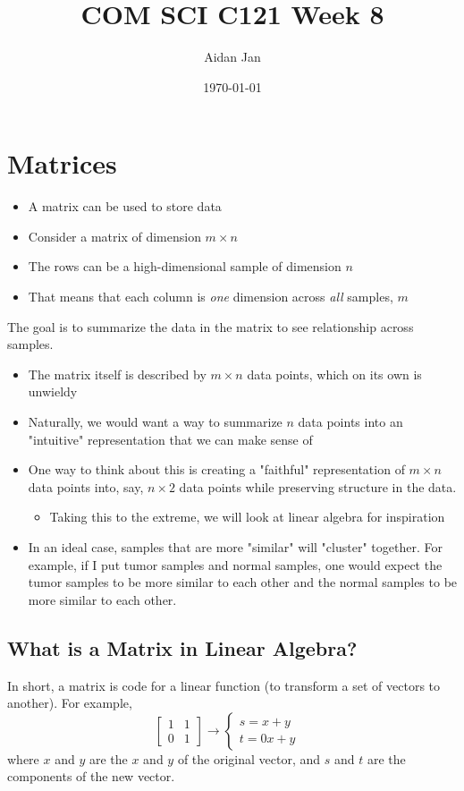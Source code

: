 \documentclass[10pt]{article}
\title{COM SCI C121 Week 8}
\author{Aidan Jan}
\date{\today}
\begin{document}
\maketitle

\section*{Matrices}
\begin{itemize}
    \item A matrix can be used to store data
    \item Consider a matrix of dimension $m \times n$
    \item The rows can be a high-dimensional sample of dimension $n$
    \item That means that each column is \textit{one} dimension across \textit{all} samples, $m$
\end{itemize}
The goal is to summarize the data in the matrix to see relationship across samples.
\begin{itemize}
    \item The matrix itself is described by $m \times n$ data points, which on its own is unwieldy
    \item Naturally, we would want a way to summarize $n$ data points into an "intuitive" representation that we can make sense of
    \item One way to think about this is creating a "faithful" representation of $m \times n$ data points into, say, $n \times 2$ data points while preserving structure in the data.
    \begin{itemize}
        \item Taking this to the extreme, we will look at linear algebra for inspiration
    \end{itemize}
    \item In an ideal case, samples that are more "similar" will "cluster" together.  For example, if I put tumor samples and normal samples, one would expect the tumor samples to be more similar to each other and the normal samples to be more similar to each other.
\end{itemize}

\subsection*{What is a Matrix in Linear Algebra?}
In short, a matrix is code for a linear function (to transform a set of vectors to another).
For example, 
\[\begin{bmatrix} 1 & 1 \\ 0 & 1 \end{bmatrix} \rightarrow \begin{cases} s = x + y & \\ t = 0x + y\end{cases}\]
where $x$ and $y$ are the $x$ and $y$ of the original vector, and $s$ and $t$ are the components of the new vector.
\end{document}
